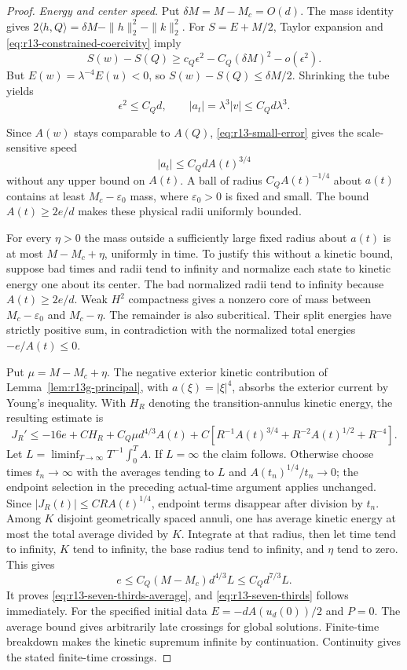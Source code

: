 \begin{proof}
\emph{Energy and center speed.}
Put $\delta M=M-M_c=O(d)$. The mass identity gives
$2\langle h,Q\rangle=\delta M-\|h\|_2^2-\|k\|_2^2$.
For $S=E+M/2$, Taylor expansion and
\eqref{eq:r13-constrained-coercivity} imply
\[
 S(w)-S(Q)\ge c_Q\epsilon^2-C_Q(\delta M)^2-o(\epsilon^2).
\]
But $E(w)=\lambda^{-4}E(u)<0$, so
$S(w)-S(Q)\le\delta M/2$. Shrinking the tube yields
\begin{equation}\label{eq:r13-small-error}
 \epsilon^2\le C_Qd,\qquad
 |a_t|=\lambda^3|v|\le C_Qd\lambda^3.
\end{equation}

Since $A(w)$ stays comparable to $A(Q)$,
\eqref{eq:r13-small-error} gives the scale-sensitive speed
\[
 |a_t|\le C_Qd A(t)^{3/4}
\]
without any upper bound on $A(t)$. A ball of radius $C_Q A(t)^{-1/4}$
about $a(t)$ contains at least $M_c-\varepsilon_0$ mass, where
$\varepsilon_0>0$ is fixed and small. The bound $A(t)\ge2e/d$ makes
these physical radii uniformly bounded.

For every $\eta>0$ the mass outside a sufficiently large fixed radius
about $a(t)$ is at most $M-M_c+\eta$, uniformly in time. To justify
this without a kinetic bound, suppose bad times and radii tend to
infinity and normalize each state to kinetic energy one about its
center. The bad normalized radii tend to infinity because
$A(t)\ge2e/d$. Weak $H^2$ compactness gives a nonzero core of mass
between $M_c-\varepsilon_0$ and $M_c-\eta$. The remainder is also
subcritical. Their split energies have strictly positive sum, in
contradiction with the normalized total energies $-e/A(t)\le0$.

Put $\mu=M-M_c+\eta$. The negative exterior kinetic contribution
of Lemma~\ref{lem:r13g-principal}, with $a(\xi)=|\xi|^4$,
absorbs the exterior current by Young's
inequality. With $H_R$ denoting the transition-annulus kinetic energy,
the resulting estimate is
\[
 J_R'\le-16e+CH_R+C_Q\mu d^{4/3}A(t)
                  +C[R^{-1}A(t)^{3/4}+R^{-2}A(t)^{1/2}+R^{-4}].
\]
Let $L=\liminf_{T\to\infty}T^{-1}\int_0^T A$. If $L=\infty$ the
claim follows. Otherwise choose times $t_n\to\infty$ with the
averages tending to $L$ and $A(t_n)^{1/4}/t_n\to0$; the endpoint
selection in the preceding actual-time argument applies unchanged.
Since $|J_R(t)|\le CR A(t)^{1/4}$, endpoint terms disappear after
division by $t_n$. Among $K$ disjoint geometrically spaced annuli,
one has average kinetic energy at most the total average divided by
$K$. Integrate at that radius, then let time tend to infinity, $K$
tend to infinity, the base radius tend to infinity, and $\eta$ tend
to zero. This gives
\[
 e\le C_Q(M-M_c)d^{4/3}L\le C_Qd^{7/3}L.
\]
It proves \eqref{eq:r13-seven-thirds-average}, and
\eqref{eq:r13-seven-thirds} follows immediately.
For the specified initial data $E=-dA(u_d(0))/2$ and $P=0$.
The average bound gives arbitrarily late crossings for global
solutions. Finite-time breakdown makes the kinetic supremum infinite
by continuation. Continuity gives the stated finite-time crossings.
\end{proof}

